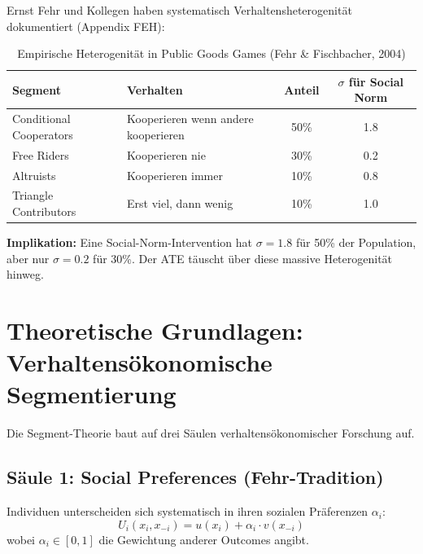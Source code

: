 Ernst Fehr und Kollegen haben systematisch Verhaltensheterogenität dokumentiert (Appendix FEH):

\begin{table}[htbp]
\centering
\caption{Empirische Heterogenität in Public Goods Games (Fehr \& Fischbacher, 2004)}
\label{tab:19-fehr-heterogeneity}
\renewcommand{\arraystretch}{1.3}
\small
\begin{tabular}{@{}llcc@{}}
\toprule
\textbf{Segment} & \textbf{Verhalten} & \textbf{Anteil} & \textbf{$\sigma$ für Social Norm} \\
\midrule
Conditional Cooperators & Kooperieren wenn andere kooperieren & 50\% & 1.8 \\
Free Riders & Kooperieren nie & 30\% & 0.2 \\
Altruists & Kooperieren immer & 10\% & 0.8 \\
Triangle Contributors & Erst viel, dann wenig & 10\% & 1.0 \\
\bottomrule
\end{tabular}
\end{table}

\textbf{Implikation:} Eine Social-Norm-Intervention hat $\sigma = 1.8$ für 50\% der Population, aber nur $\sigma = 0.2$ für 30\%. Der ATE täuscht über diese massive Heterogenität hinweg.


\section{Theoretische Grundlagen: Verhaltensökonomische Segmentierung}
\label{sec:19-theory}

Die Segment-Theorie baut auf drei Säulen verhaltensökonomischer Forschung auf.

\subsection{Säule 1: Social Preferences (Fehr-Tradition)}

\begin{tcolorbox}[colback=blue!5!white, colframe=blue!75!black,
    title=Axiom PAP1-1: Social Preference Heterogeneity]
Individuen unterscheiden sich systematisch in ihren sozialen Präferenzen $\alpha_i$:
\begin{equation}
U_i(x_i, x_{-i}) = u(x_i) + \alpha_i \cdot v(x_{-i})
\label{eq:19-social-utility}
\end{equation}
wobei $\alpha_i \in [0, 1]$ die Gewichtung anderer Outcomes angibt.
\end{tcolorbox}

